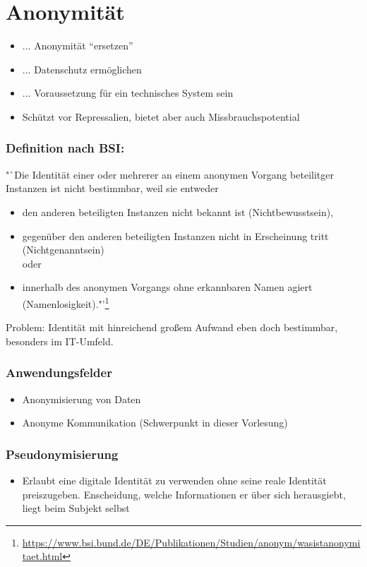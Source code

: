 \section{Anonymität}
\begin{itemize}
	\item ... Anonymität "`ersetzen"'
	\item ... Datenschutz ermöglichen
	\item ... Voraussetzung für ein technisches System sein
	\item Schützt vor Repressalien, bietet aber auch Missbrauchspotential
\end{itemize}

\subsubsection{Definition nach BSI:}
"`Die Identität einer oder mehrerer an einem anonymen Vorgang beteilitger Instanzen ist nicht bestimmbar, weil sie entweder
\begin{itemize}
	\item den anderen beteiligten Instanzen nicht bekannt ist (Nichtbewusstsein),
	\item gegenüber den anderen beteiligten Instanzen nicht in Erscheinung tritt (Nichtgenanntsein) \\ oder
	\item innerhalb des anonymen Vorgangs ohne erkannbaren Namen agiert (Namenlosigkeit)."'\footnote{\url{https://www.bsi.bund.de/DE/Publikationen/Studien/anonym/wasistanonymitaet.html}}
\end{itemize}

Problem: Identität mit hinreichend großem Aufwand eben doch bestimmbar, besonders im IT-Umfeld.

\subsubsection{Anwendungsfelder}
\begin{itemize}
	\item Anonymisierung von Daten
	\item Anonyme Kommunikation (Schwerpunkt in dieser Vorlesung)
\end{itemize}

\subsubsection{Pseudonymisierung}
\begin{itemize}
	\item Erlaubt eine digitale Identität zu verwenden ohne seine reale Identität preiszugeben. Enscheidung, welche Informationen er über sich herausgiebt, liegt beim Subjekt selbst
\end{itemize}

